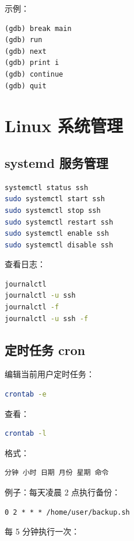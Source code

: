 \documentclass[UTF8,a4paper,12pt]{ctexart}
\begin{document}
示例：

\begin{lstlisting}
(gdb) break main
(gdb) run
(gdb) next
(gdb) print i
(gdb) continue
(gdb) quit
\end{lstlisting}

\section{Linux 系统管理}

\subsection{systemd 服务管理}

\begin{lstlisting}[language=bash]
systemctl status ssh
sudo systemctl start ssh
sudo systemctl stop ssh
sudo systemctl restart ssh
sudo systemctl enable ssh
sudo systemctl disable ssh
\end{lstlisting}

查看日志：

\begin{lstlisting}[language=bash]
journalctl
journalctl -u ssh
journalctl -f
journalctl -u ssh -f
\end{lstlisting}

\subsection{定时任务 cron}

编辑当前用户定时任务：

\begin{lstlisting}[language=bash]
crontab -e
\end{lstlisting}

查看：

\begin{lstlisting}[language=bash]
crontab -l
\end{lstlisting}

格式：

\begin{lstlisting}
分钟 小时 日期 月份 星期 命令
\end{lstlisting}

例子：每天凌晨 2 点执行备份：

\begin{lstlisting}
0 2 * * * /home/user/backup.sh
\end{lstlisting}

每 5 分钟执行一次：
\end{document}
